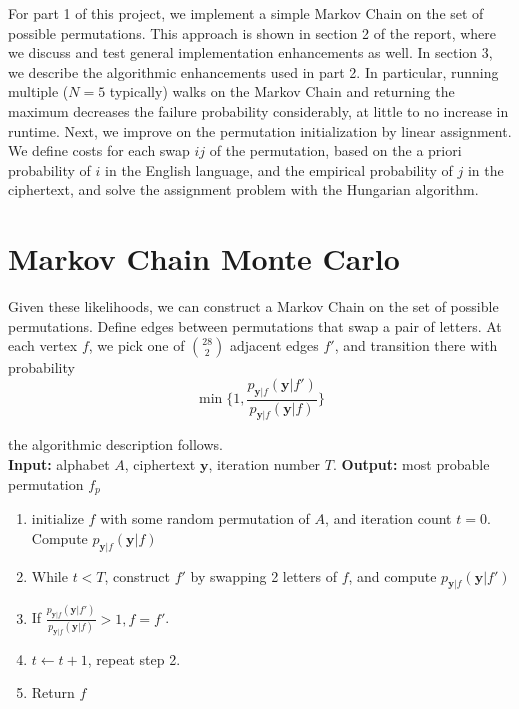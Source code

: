 \documentclass[aps,prd,final,twocolumn,letterpaper]{revtex4}
\begin{document}
For part 1 of this project, we implement a simple Markov Chain on the set of possible permutations. This approach is shown in section 2 of the report, where we discuss and test general implementation enhancements as well. In section 3, we describe the algorithmic enhancements used in part 2. In particular, running multiple ($N = 5$ typically) walks on the Markov Chain and returning the maximum decreases the failure probability considerably, at little to no increase in runtime. Next, we improve on the permutation initialization by linear assignment. We define costs for each swap $ij$ of the permutation, based on the a priori probability of $i$ in the English language, and the empirical probability of $j$ in the ciphertext, and solve the assignment problem with the Hungarian algorithm.

\section{Markov Chain Monte Carlo}
Given these likelihoods, we can construct a Markov Chain on the set of possible permutations. Define edges between permutations that swap a pair of letters. At each vertex $f$, we pick one of $\binom{28}{2}$ adjacent edges $f'$, and transition there with probability
\begin{equation}
\min\{1, \frac{p_{\mathbf{y}|f}(\mathbf{y}|f')}{p_{\mathbf{y}|f}(\mathbf{y}|f)}\}
\end{equation}

the algorithmic description follows.\\

\noindent \textbf{Input:} alphabet $A$, ciphertext $\mathbf{y}$, iteration number $T$.
\noindent\textbf{Output:} most probable permutation $f_p$



\begin{enumerate}
\item initialize $f$ with some random permutation of $A$, and iteration count $t=0$. Compute $p_{\mathbf{y}|f}(\mathbf{y}|f)$
\item While $t<T$, construct $f'$ by swapping 2 letters of $f$, and compute $p_{\mathbf{y}|f}(\mathbf{y}|f')$
\item If $\frac{p_{\mathbf{y}|f}(\mathbf{y}|f')}{p_{\mathbf{y}|f}(\mathbf{y}|f)}> 1, f=f'$. 
\item $t\leftarrow t + 1$, repeat step 2.
\item Return $f$
\end{enumerate}
\end{document}
